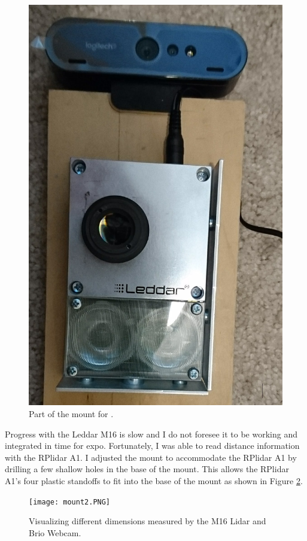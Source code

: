 \documentclass[onecolumn, draftclsnofoot,10pt, compsoc]{IEEEtran}
\makeatletter
\newcommand\captionof[1]{\def\@captype{#1}\caption}
\makeatother
\begin{document}
\begin{singlespace}
		\begin{figure}[H]
			\includegraphics[scale=0.2]{mount1.PNG}
			\captionof{figure}{Part of the mount for .}
			\label{mount1}
		\end{figure}


		Progress with the Leddar M16 is slow and I do not foresee it to be working and integrated in time for expo.
		Fortunately, I was able to read distance information with the RPlidar A1.
		I adjusted the mount to accommodate the RPlidar A1 by drilling a few shallow holes in the base of the mount.
		This allows the RPlidar A1's four plastic standoffs to fit into the base of the mount as shown in Figure \ref{mount2}.

		\begin{figure}[H]
			\texttt{[image: mount2.PNG]}
			\captionof{figure}{Visualizing different dimensions measured by the M16 Lidar and Brio Webcam.}
			\label{mount2}
		\end{figure}


\end{singlespace}
\end{document}
